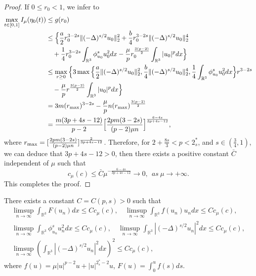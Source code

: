 \begin{proof}
If $0 \leq r_0<1$, we infer to
\begin{align*}
\max_{t\in[0,1]} I_\mu(\eta_0(t))&\leq  g(r_0)\\
&\leq  \Big\{\frac{a}{2}r^{3-2s}_0\|(-\Delta)^{s/2}u_0\|^2_2
 +\frac{b}{4}r^{3-2s}_0\|(-\Delta)^{s/2}u_0\|^4_2\\
&\quad +\frac{1}{4}r^{3-2s}_0\int_{\mathbb{R}^3}\phi^s_{u_0}u^2_0dx
 -\frac{\mu}{p}r^{\frac{3(p-2)}{2}}_0\int_{\mathbb{R}^3}|u_0|^pdx\Big\}\\
&\leq  \max_{r\geq 0}\Big\{3\max\Big\{\frac{a}{2}\|(-\Delta)^{s/2}u_0\|^2_2, 
 \frac{b}{4}\|(-\Delta)^{s/2}u_0\|^4_2,
\frac{1}{4}\int_{\mathbb{R}^3}\phi^s_{u_0}u^2_0dx  \Big\}r^{3-2s}\\
&\quad -\frac{\mu}{p}r^{\frac{3(p-2)}{2}}\int_{\mathbb{R}^3}|u_0|^pdx\Big\}\\
&= 3m(r_{\rm max})^{3-2s}-\frac{\mu}{p}n(r_{\rm max})^{\frac{3(p-2)}{2}}\\
&= \frac{m(3p+4s-12)}{p-2}\Big[\frac{2pm(3-2s)}{(p-2)\mu n}\Big]^{\frac{6-4s}{3p+4s-12}},
\end{align*}
where $r_{\rm max}=[\frac{2pm(3-2s)}{(p-2)\mu n}]^{\frac{2}{3p+4s-12}}$.
Therefore, for $2+\frac{8s}{3}<p<2^*_s$, and $s\in{(\frac{3}{4}, 1)}$, we can deduce 
that $3p+4s-12>0$, then there exists a positive constant $\bar{C}$ independent of
 $\mu$ such that
$$
c_\mu (c)\leq \bar{C}{\mu}^{-\frac{6-4s}{3p+4s-12}}\to 0, ~~as~\mu\to +\infty.
$$
This completes the proof.
\end{proof}

\begin{lemma}\label{lem5.8} 
There exists  a constant $C=C(p,s)>0$ such that
\begin{gather*}
\limsup_{n\to \infty} \int_{\mathbb{R}^3}F(u_n)dx\leq C c_\mu(c), \quad
\limsup_{n\to \infty} \int_{\mathbb{R}^3}f(u_n){u_n}dx\leq C c_\mu(c), \\
\limsup_{n\to \infty} \int_{\mathbb{R}^3}\phi^s_{u_n}u^2_ndx\leq C c_\mu(c),\quad 
\limsup_{n\to \infty} \int_{\mathbb{R}^3}|(-\Delta)^{s/2}u_n|^2dx\leq C c_\mu(c),\\
\limsup_{n\to \infty} (\int_{\mathbb{R}^3}|(-\Delta)^{s/2}u_n|^2dx)^2\leq C c_\mu(c),
\end{gather*}
where $f(u)=\mu|u|^{p-2}u+|u|^{2^*_s-2}u$, $F(u)=\int^u_0 f(s)ds$.
\end{lemma}

